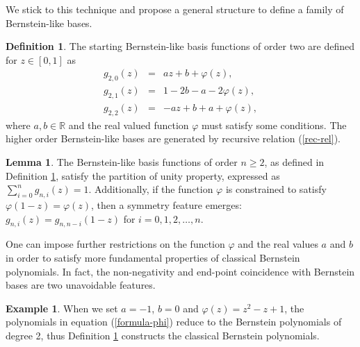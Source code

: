 \documentclass[preprint,12pt]{elsarticle}
\theoremstyle{definition}
\newtheorem{definition}{Definition}
\theoremstyle{theorem}
\theoremstyle{lemma}
\newtheorem{lemma}{Lemma}
\theoremstyle{example}
\newtheorem{example}{Example}
\theoremstyle{remark}
\theoremstyle{prop}
\begin{document}
We stick to this technique and propose  a general structure to define a family of Bernstein-like bases.

\begin{definition} \label{defphi}
The starting Bernstein-like basis functions of order two are  defined  for $z \in [0,1]$ as 
\begin{eqnarray} 
g_{2,0}(z)&=&az+b+\varphi(z),\nonumber \\
g_{2,1}(z)&=&1-2b-a-2\varphi(z), \label{formula-phi}\\
g_{2,2}(z)&=&-az+b+a+\varphi(z),\nonumber
\end{eqnarray} 
where $a,b \in \mathbb{R}$  and the real valued function $\varphi$ must satisfy some conditions. The higher order Bernstein-like bases are  generated by recursive relation (\ref{rec-rel}).
\end{definition}

\begin{lemma}\label{lem1} 
 The Bernstein-like basis functions of order \(n \geq 2\), as defined in Definition \ref{defphi}, satisfy the partition of unity property, expressed as \( \sum_{i=0}^{n}g_{n,i}(z)=1 \). Additionally, if the function \(\varphi\) is constrained to satisfy \(\varphi(1-z)=\varphi(z)\), then a symmetry feature emerges: \( g_{n,i}(z)=g_{n,n-i}(1-z) \) for \( i = 0, 1, 2, \ldots , n \).

\end{lemma}

One can impose further restrictions on the  function $\varphi$ and the real values $a$ and $b$ in order to satisfy more fundamental properties of classical Bernstein polynomials. In fact,  the non-negativity and end-point coincidence with Bernstein bases are two unavoidable features.

\begin{example}
When  we set $a=-1$, $b=0$ and $\varphi(z)=z^2-z+1$, the  polynomials in equation (\ref{formula-phi}) reduce to the   Bernstein polynomials of degree 2, thus Definition \ref{defphi} constructs the classical Bernstein polynomials.
\end{example}
\end{document}
